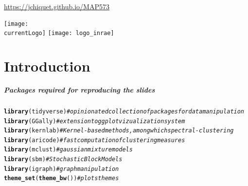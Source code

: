 \documentclass{beamer}\usepackage[]{graphicx}\usepackage[]{color}
\title{\currentCourse}
\subtitle{\huge\currentChapter\normalsize}
\institute{\currentInstitute}
\date{\currentDate}
\makeatletter
\newcommand{\hlcom}[1]{\textcolor[rgb]{0.678,0.584,0.686}{\textit{#1}}}%
\newcommand{\hlstd}[1]{\textcolor[rgb]{0.345,0.345,0.345}{#1}}%
\newcommand{\hlkwd}[1]{\textcolor[rgb]{0.737,0.353,0.396}{\textbf{#1}}}%
\newenvironment{kframe}{%
 \def\at@end@of@kframe{}%
 \ifinner\ifhmode%
  \def\at@end@of@kframe{\end{minipage}}%
  \begin{minipage}{\columnwidth}%
 \fi\fi%
 \def\FrameCommand##1{\hskip\@totalleftmargin \hskip-\fboxsep
 \colorbox{shadecolor}{##1}\hskip-\fboxsep
     \hskip-\linewidth \hskip-\@totalleftmargin \hskip\columnwidth}%
 \MakeFramed {\advance\hsize-\width
   \@totalleftmargin\z@ \linewidth\hsize
   \@setminipage}}%
 {\par\unskip\endMakeFramed%
 \at@end@of@kframe}
\newenvironment{knitrout}{}{} %
\def\currentLogo{../common_figs/logo_X}
\newcommand{\dotitlepage}{%
  \begin{frame}
    \titlepage
    \vfill
    \begin{center}
        \scriptsize\url{https://jchiquet.github.io/MAP573}
    \end{center}
    \vfill
    \texttt{[image: \\currentLogo]}\hfill
    \texttt{[image: logo\_inrae]}
  \end{frame}
}
\makeatother
\begin{document}
\dotitlepage

\part{Introduction}

\begin{frame}[fragile]
  \frametitle{Packages required for reproducing the slides}
  
\begin{knitrout}\scriptsize
{}\color{fgcolor}\begin{kframe}
\begin{alltt}
\hlkwd{library}\hlstd{(tidyverse)}  \hlcom{# opinionated collection of packages for data manipulation}
\hlkwd{library}\hlstd{(GGally)}     \hlcom{# extension to ggplot vizualization system}
\hlkwd{library}\hlstd{(kernlab)}    \hlcom{# Kernel-based methods, among which spectral-clustering}
\hlkwd{library}\hlstd{(aricode)}    \hlcom{# fast computation of clustering measures}
\hlkwd{library}\hlstd{(mclust)}     \hlcom{# gaussian mixture models}
\hlkwd{library}\hlstd{(sbm)}        \hlcom{# Stochastic Block Models}
\hlkwd{library}\hlstd{(igraph)}     \hlcom{# graph manipulation}
\hlkwd{theme_set}\hlstd{(}\hlkwd{theme_bw}\hlstd{())} \hlcom{# plots themes}
\end{alltt}
\end{kframe}
\end{knitrout}
  
\end{frame}
\end{document}
